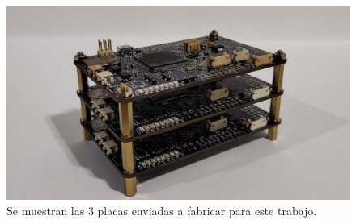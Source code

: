 \begin{figure}[htb]
    \centering
    \includegraphics[width=\textwidth]{img/pruebas_stackeadas.png}
    \caption{Se muestran las 3 placas enviadas a fabricar para este trabajo.}
    \label{fig:choris_4}
\end{figure}






